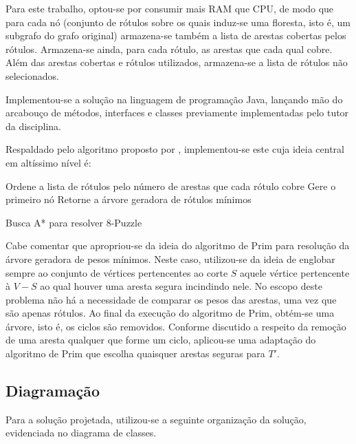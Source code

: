 \documentclass[12pt]{article}
\begin{document}
		Para este trabalho, optou-se por consumir mais RAM que CPU, de modo que para cada nó (conjunto de rótulos sobre os quais induz-se uma floresta, isto é, um subgrafo do grafo original) armazena-se também a lista de arestas cobertas pelos rótulos. Armazena-se ainda, para cada rótulo, as arestas que cada qual cobre. Além das arestas cobertas e rótulos utilizados, armazena-se a lista de rótulos não selecionados.

		Implementou-se a solução na linguagem de programação Java, lançando mão do arcabouço de métodos, interfaces e classes previamente implementadas pelo tutor da disciplina.

		Respaldado pelo algoritmo proposto por \cite{chang:1996}, implementou-se este cuja ideia central em altíssimo nível é:

		\begin{algorithm}[H]
			\SetAlgoLined
			Ordene a lista de rótulos pelo número de arestas que cada rótulo cobre\;
			Gere o primeiro nó\;
			Retorne a árvore geradora de rótulos mínimos\;
			\caption{Busca A* para resolver 8-Puzzle}
		\end{algorithm}

		Cabe comentar que apropriou-se da ideia do algoritmo de Prim para resolução da árvore geradora de pesos mínimos. Neste caso, utilizou-se da ideia de englobar sempre ao conjunto de vértices pertencentes ao corte $S$ aquele vértice pertencente à $V - S$ ao qual houver uma aresta segura incindindo nele. No escopo deste problema não há a necessidade de comparar os pesos das arestas, uma vez que são apenas rótulos. Ao final da execução do algoritmo de Prim, obtém-se uma árvore, isto é, os ciclos são removidos. Conforme discutido a respeito da remoção de uma aresta qualquer que forme um ciclo, aplicou-se uma adaptação do algoritmo de Prim que escolha quaisquer arestas seguras para $T'$.

	\subsection{Diagramação}\label{sec:diagramacao}

		Para a solução projetada, utilizou-se a seguinte organização da solução, evidenciada no diagrama de classes.
\end{document}
